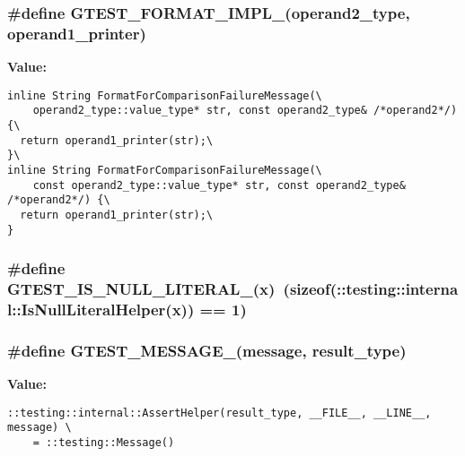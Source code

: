 \subsubsection{\setlength{\rightskip}{0pt plus 5cm}\#define GTEST\_\-FORMAT\_\-IMPL\_\-(operand2\_\-type, operand1\_\-printer)}\label{gtest-internal_8h_b28df812a3f2058e7055b99b81f9b329}


\textbf{Value:}

\begin{Code}\begin{verbatim}inline String FormatForComparisonFailureMessage(\
    operand2_type::value_type* str, const operand2_type& /*operand2*/) {\
  return operand1_printer(str);\
}\
inline String FormatForComparisonFailureMessage(\
    const operand2_type::value_type* str, const operand2_type& /*operand2*/) {\
  return operand1_printer(str);\
}
\end{verbatim}
\end{Code}
\subsubsection{\setlength{\rightskip}{0pt plus 5cm}\#define GTEST\_\-IS\_\-NULL\_\-LITERAL\_\-(x)~(sizeof(::testing::internal::IsNullLiteralHelper(x)) == 1)}\label{gtest-internal_8h_2fb2ba8dad1e80ba6033003532d1792e}


\subsubsection{\setlength{\rightskip}{0pt plus 5cm}\#define GTEST\_\-MESSAGE\_\-(message, result\_\-type)}\label{gtest-internal_8h_2c2f05a173d1ce255815db3f0941a89d}


\textbf{Value:}

\begin{Code}\begin{verbatim}::testing::internal::AssertHelper(result_type, __FILE__, __LINE__, message) \
    = ::testing::Message()
\end{verbatim}
\end{Code}
